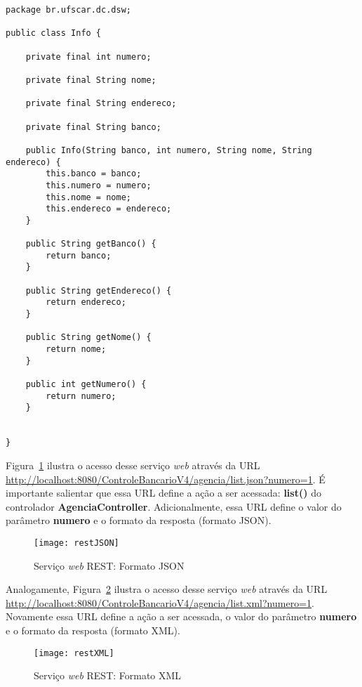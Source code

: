 \begin{lstlisting}[caption=Classe  Java   {\bf  Info},  frame=trBL,  float=htbp,
    label=codInfo] 
package br.ufscar.dc.dsw;

public class Info {
    
    private final int numero;

    private final String nome;

    private final String endereco;

    private final String banco;

    public Info(String banco, int numero, String nome, String endereco) {
        this.banco = banco;
        this.numero = numero;
        this.nome = nome;
        this.endereco = endereco;
    }

    public String getBanco() {
        return banco;
    }

    public String getEndereco() {
        return endereco;
    }

    public String getNome() {
        return nome;
    }

    public int getNumero() {
        return numero;
    }
    
    
}
\end{lstlisting}

Figura~\ref{figJSON} ilustra  o acesso  desse serviço {\it  web} através  da URL
{\footnotesize\url{http://localhost:8080/ControleBancarioV4/agencia/list.json?numero=1}}.
É importante salientar  que essa URL define a ação a  ser acessada: {\bf list()}
do controlador {\bf AgenciaController}.  Adicionalmente, essa URL define o valor
do parâmetro {\bf numero} e o formato da resposta (formato JSON).

\vspace{0.5cm}

\begin{figure}[h]
\centering\texttt{[image: restJSON]}
\caption{Serviço {\it web} REST: Formato JSON}
\label{figJSON}
\end{figure}

Analogamente, Figura~\ref{figXML} ilustra o acesso desse serviço {\it web} através da URL
{\footnotesize\url{http://localhost:8080/ControleBancarioV4/agencia/list.xml?numero=1}}. 
Novamente  essa URL define  a ação  a ser  acessada, o  valor do  parâmetro {\bf
  numero} e o formato da resposta (formato XML). 

\vspace{0.5cm}

\begin{figure}[h]
\centering\texttt{[image: restXML]}
\caption{Serviço {\it web} REST: Formato XML}
\label{figXML}
\end{figure}

